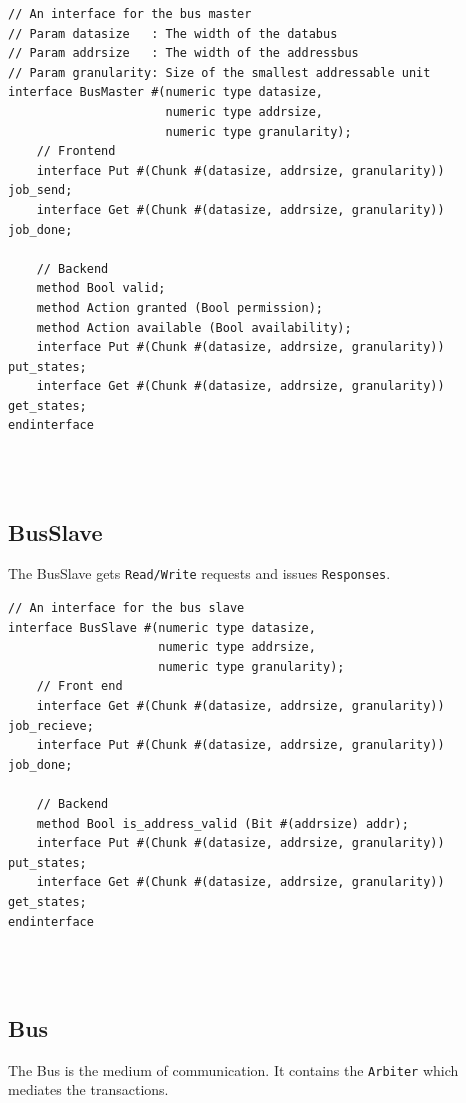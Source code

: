 \begin{paper}
\begin{verbatim}
// An interface for the bus master
// Param datasize   : The width of the databus
// Param addrsize   : The width of the addressbus
// Param granularity: Size of the smallest addressable unit
interface BusMaster #(numeric type datasize,
                      numeric type addrsize, 
                      numeric type granularity);
    // Frontend
    interface Put #(Chunk #(datasize, addrsize, granularity)) job_send;
    interface Get #(Chunk #(datasize, addrsize, granularity)) job_done;

    // Backend
    method Bool valid;
    method Action granted (Bool permission);
    method Action available (Bool availability);
    interface Put #(Chunk #(datasize, addrsize, granularity)) put_states;
    interface Get #(Chunk #(datasize, addrsize, granularity)) get_states;
endinterface

\end{verbatim}\\\\

\subsection*{BusSlave\sdot}
The BusSlave gets \texttt{Read/Write} requests and issues \texttt{Responses}.

\begin{verbatim}
// An interface for the bus slave
interface BusSlave #(numeric type datasize,
                     numeric type addrsize, 
                     numeric type granularity);
    // Front end
    interface Get #(Chunk #(datasize, addrsize, granularity)) job_recieve;
    interface Put #(Chunk #(datasize, addrsize, granularity)) job_done;

    // Backend
    method Bool is_address_valid (Bit #(addrsize) addr);
    interface Put #(Chunk #(datasize, addrsize, granularity)) put_states;
    interface Get #(Chunk #(datasize, addrsize, granularity)) get_states;
endinterface

\end{verbatim}\\\\

\subsection*{Bus\sdot}
The Bus is the medium of communication. It contains the \texttt{Arbiter} which mediates the transactions.



\end{paper}
